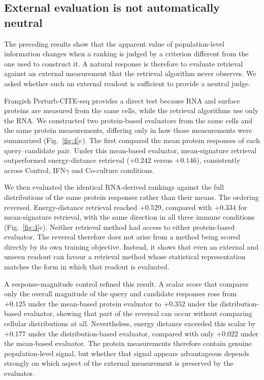 \documentclass[11pt,letterpaper]{article}
\begin{document}
\subsection*{External evaluation is not automatically neutral}

The preceding results show that the apparent value of population-level information changes when a ranking is judged by a criterion different from the one used to construct it. A natural response is therefore to evaluate retrieval against an external measurement that the retrieval algorithm never observes. We asked whether such an external readout is sufficient to provide a neutral judge.

Frangieh Perturb-CITE-seq\cite{dataFrangieh} provides a direct test because RNA and surface proteins are measured from the same cells, while the retrieval algorithms use only the RNA. We constructed two protein-based evaluators from the same cells and the same protein measurements, differing only in how those measurements were summarized (Fig.~\ref{fig:4}c). The first compared the mean protein responses of each query--candidate pair. Under this mean-based evaluator, mean-signature retrieval outperformed energy-distance retrieval ($+0.242$ versus $+0.146$), consistently across Control, IFN$\gamma$ and Co-culture conditions.

We then evaluated the identical RNA-derived rankings against the full distributions of the same protein responses rather than their means. The ordering reversed. Energy-distance retrieval reached $+0.529$, compared with $+0.334$ for mean-signature retrieval, with the same direction in all three immune conditions (Fig.~\ref{fig:4}c). Neither retrieval method had access to either protein-based evaluator. The reversal therefore does not arise from a method being scored directly by its own training objective. Instead, it shows that even an external and unseen readout can favour a retrieval method whose statistical representation matches the form in which that readout is evaluated.

A response-magnitude control refined this result. A scalar score that compares only the overall magnitude of the query and candidate responses rose from $+0.125$ under the mean-based protein evaluator to $+0.352$ under the distribution-based evaluator, showing that part of the reversal can occur without comparing cellular distributions at all. Nevertheless, energy distance exceeded this scalar by $+0.177$ under the distribution-based evaluator, compared with only $+0.022$ under the mean-based evaluator. The protein measurements therefore contain genuine population-level signal, but whether that signal appears advantageous depends strongly on which aspect of the external measurement is preserved by the evaluator.
\end{document}
